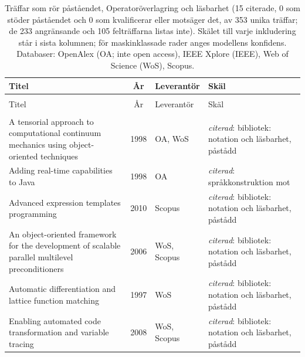 
\begingroup\footnotesize
\begin{longtable}{@{}%
  >{\raggedright\arraybackslash}p{}c%
  >{\raggedright\arraybackslash}p{}%
  >{\raggedright\arraybackslash}p{}@{}}
\caption{Träffar som rör påståendet, Operatoröverlagring och läsbarhet (15 citerade, 0 som stöder påståendet och 0 som kvalificerar eller motsäger det, av 353 unika träffar; de 233 angränsande och 105 felträffarna listas inte). Skälet till varje inkludering står i sista kolumnen; för maskinklassade rader anges modellens konfidens. Databaser: OpenAlex (OA; inte open access), IEEE Xplore (IEEE), Web of Science (WoS), Scopus.}\label{tab:sok-overlagring}\\
\toprule
Titel & År & Leverantör & Skäl \\
\midrule
\endfirsthead
\multicolumn{4}{@{}l}{\emph{\tablename~\thetable{} (forts.)}}\\
\toprule
Titel & År & Leverantör & Skäl \\
\midrule
\endhead
\midrule \multicolumn{4}{r@{}}{\emph{forts.\ på nästa sida}}\\
\endfoot
\bottomrule
\endlastfoot
A tensorial approach to computational continuum mechanics using object-oriented techniques & 1998 & OA, WoS & \emph{citerad}: bibliotek: notation och läsbarhet, påstådd \\
Adding real-time capabilities to Java & 1998 & OA & \emph{citerad}: språkkonstruktion mot \\
Advanced expression templates programming & 2010 & Scopus & \emph{citerad}: bibliotek: notation och läsbarhet, påstådd \\
An object-oriented framework for the development of scalable parallel multilevel preconditioners & 2006 & WoS, Scopus & \emph{citerad}: bibliotek: notation och läsbarhet, påstådd \\
Automatic differentiation and lattice function matching & 1997 & WoS & \emph{citerad}: bibliotek: notation och läsbarhet, påstådd \\
Enabling automated code transformation and variable tracing & 2008 & WoS, Scopus & \emph{citerad}: bibliotek: notation och läsbarhet, påstådd \\

\end{longtable}
